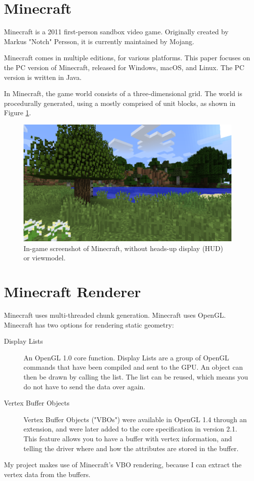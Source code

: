 \documentclass[]{article}
\begin{document}

\newpage
\tableofcontents
\newpage

\section{Minecraft}
Minecraft is a 2011 first-person sandbox video game.
Originally created by Markus "Notch" Persson, it is currently maintained by Mojang.


Minecraft comes in multiple editions, for various platforms. This paper focuses on the PC version of Minecraft, released for Windows, macOS, and Linux.
The PC version is written in Java.

In Minecraft, the game world consists of a three-dimensional grid.
The world is procedurally generated, using a 
mostly comprised of unit blocks, as shown in Figure \ref{fig:ss-worldgen}.

\begin{figure}
  \includegraphics[width=\textwidth]{ss-worldgen.png}
  \centering
  \caption{In-game screenshot of Minecraft, without heads-up display (HUD) or viewmodel.}
  \label{fig:ss-worldgen}
\end{figure}

\section{Minecraft Renderer}
Minecraft uses multi-threaded chunk generation.
Minecraft uses OpenGL.
Minecraft has two options for rendering static geometry:
\begin{description}
  \item[Display Lists] An OpenGL 1.0 core function.
    Display Lists are a group of OpenGL commands that have been compiled and sent to the GPU.
    An object can then be drawn by calling the list.
    The list can be reused, which means you do not have to send the data over again.
  \item[Vertex Buffer Objects] Vertex Buffer Objects ("VBOs") were available in OpenGL 1.4 through an extension, and were later added to the core specification in version 2.1.
    This feature allows you to have a buffer with vertex information, and telling the driver where and how the attributes are stored in the buffer.
\end{description}
My project makes use of Minecraft's VBO rendering, because I can extract the vertex data from the buffers.
\end{document}
